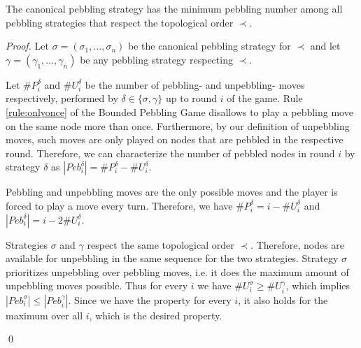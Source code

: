 \begin{theorem}
\label{theorem:canonical}
The canonical pebbling strategy has the minimum pebbling number among all pebbling strategies that respect the topological order $\prec$.
\end{theorem}
\begin{proof}
Let $\sigma = (\sigma_1,\ldots,\sigma_n)$ be the canonical pebbling strategy for $\prec$ and let $\gamma = (\gamma_1,\ldots,\gamma_n)$ be any pebbling strategy respecting $\prec$.

Let $\#P^{\delta}_i$ and $\#U^{\delta}_i$ be the number of pebbling- and unpebbling- moves respectively, performed by $\delta \in \{\sigma,\gamma\}$ up to round $i$ of the game.
Rule \ref{rule:onlyonce} of the Bounded Pebbling Game disallows to play a pebbling move on the same node more than once.
Furthermore, by our definition of unpebbling moves, such moves are only played on nodes that are pebbled in the respective round.
Therefore, we can characterize the number of pebbled nodes in round $i$ by strategy $\delta$ as $|Peb^{\delta}_i| = \#P^{\delta}_i - \#U^{\delta}_i$.

Pebbling and unpebbling moves are the only possible moves and the player is forced to play a move every turn.
Therefore, we have $\#P^{\delta}_i = i - \#U^{\delta}_i$ and $|Peb^{\delta}_i| = i - 2 \#U^{\delta}_i$.

Strategies $\sigma$ and $\gamma$ respect the same topological order $\prec$.
Therefore, nodes are available for unpebbling in the same sequence for the two strategies.
Strategy $\sigma$ prioritizes unpebbling over pebbling moves, i.e. it does the maximum amount of unpebbling moves possible.
Thus for every $i$ we have $\#U^{\sigma}_i \geq \#U^{\gamma}_i$, which implies $|Peb^{\sigma}_i| \leq |Peb^{\gamma}_i|$.
Since we have the property for every $i$, it also holds for the maximum over all $i$, which is the desired property. 

\noindent\qed


\end{proof}
